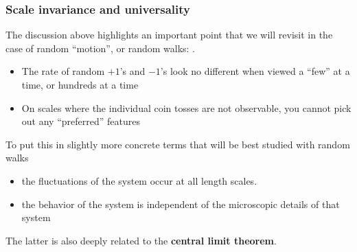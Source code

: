 \documentclass[hyperref={colorlinks=true}]{beamer}
\begin{document}
\begin{frame}%
  \frametitle{Scale invariance and universality}
  
  The discussion above highlights an important point that we will revisit in the case of random ``motion'', or random walks: .
  
  \begin{itemize}
    \item The rate of random $+1$'s and $-1$'s look no different when viewed a ``few'' at a time, or hundreds at a time
    \item On scales where the individual coin tosses are not observable, you cannot pick out any ``preferred'' features
  \end{itemize}
  
  To put this in slightly more concrete terms that will be best studied with random walks
  
  \begin{itemize}
    \item {} the fluctuations of the system occur at all length scales.
    \item {} the behavior of the system is independent of the microscopic details of that system
  \end{itemize}
  
  The latter is also deeply related to the \textbf{central limit theorem}.
  
\end{frame}

\end{document}
